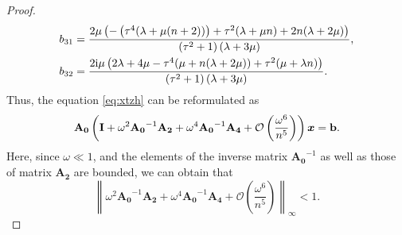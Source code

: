 \documentclass[10pt,a4paper]{amsart}
\begin{document}
\begin{proof}
\begin{align}
		b_{31}&=\frac{2 \mu  \left(-\left(\tau ^4 (\lambda +\mu  (n+2))\right)+\tau ^2 (\lambda +\mu  n)+2 n (\lambda +2 \mu )\right)}{ \left(\tau ^2+1\right) (\lambda +3 \mu )},\notag\\
		b_{32}&=\frac{2 \mathrm{i} \mu  \left(2 \lambda +4 \mu -\tau ^4 (\mu +n (\lambda +2 \mu ))+\tau ^2 (\mu +\lambda  n)\right)}{ \left(\tau ^2+1\right) (\lambda +3 \mu )}.\notag
	\end{align}
	Thus, the equation \eqref{eq:xtzh} can be reformulated as 
	\begin{align}
		\mathbf{A_0}\left(\mathbf{I}+\omega^2\mathbf{A_0}^{-1}\mathbf{A_2}+\omega^4\mathbf{A_0}^{-1}\mathbf{A_4}+\mathcal{O}\left(\frac{\omega^6}{n^5}\right)\right)\bm{x}=\mathbf{b}.\notag
	\end{align}
	Here, since \(\omega \ll 1\), and the elements of the inverse matrix $\mathbf{A_0}^{-1}$ as well as those of matrix $\mathbf{A_2}$ are bounded, we can obtain that
	\[
	\left\|\omega^2\mathbf{A_0}^{-1}\mathbf{A_2}+\omega^4\mathbf{A_0}^{-1}\mathbf{A_4}+\mathcal{O}\left(\frac{\omega^6}{n^5}\right)\right\|_{\infty}<1.
	\]
	

\end{proof}
\end{document}
